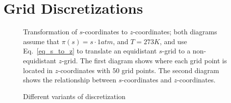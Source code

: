 \section{Grid Discretizations}\label{sec:grid_discretization}
\begin{figure}[ht]
    \caption{Transformation of $s$-coordinates to $z$-coordinates;
    both diagrams assume that $\pi (s)=s\cdot 1atm$, and $T=273K$, and use Eq.~\ref{eq_s_to_z} to translate an equidistant $s$-grid to a non-equidistant $z$-grid.
    The first diagram shows where each grid point is located in $z$-coordinates with $50$ grid points. 
    The second diagram shows the relationship between $s$-coordinates and $z$-coordinates.}
    \label{fig:s_grid}
\end{figure}
\begin{figure}[ht]
    \caption{Different variants of discretization}
    \label{fig:grid_discretization}
\end{figure}
